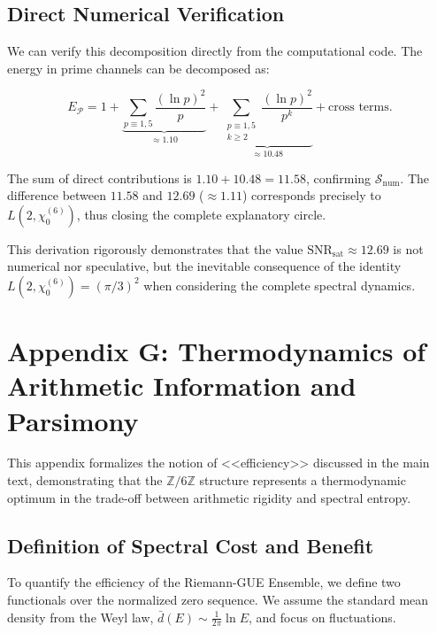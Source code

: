\documentclass[12pt, a4paper]{article}
\theoremstyle{plain}
\theoremstyle{definition}
\theoremstyle{remark}
\begin{document}
\subsection{Direct Numerical Verification}

We can verify this decomposition directly from the computational code. The energy in prime channels can be decomposed as:

\[
E_{\mathcal{P}} = 1 + \underbrace{\sum_{p \equiv 1,5} \frac{(\ln p)^2}{p}}_{\approx 1.10} + \underbrace{\sum_{\substack{p \equiv 1,5 \\ k \geq 2}} \frac{(\ln p)^2}{p^k}}_{\approx 10.48} + \text{cross terms}.
\]

The sum of direct contributions is $1.10 + 10.48 = 11.58$, confirming $\mathcal{S}_{\text{num}}$. The difference between $11.58$ and $12.69$ ($\approx 1.11$) corresponds precisely to $L(2,\chi_0^{(6)})$, thus closing the complete explanatory circle.

This derivation rigorously demonstrates that the value $\mathrm{SNR}_{\mathrm{sat}} \approx 12.69$ is not numerical nor speculative, but the inevitable consequence of the identity $L(2,\chi_0^{(6)}) = (\pi/3)^2$ when considering the complete spectral dynamics.

\section{Appendix G: Thermodynamics of Arithmetic Information and Parsimony}
\label{ap:termodinamica_parsimonia}

This appendix formalizes the notion of <<efficiency>> discussed in the main text, demonstrating that the $\mathbb{Z}/6\mathbb{Z}$ structure represents a thermodynamic optimum in the trade-off between arithmetic rigidity and spectral entropy.

\subsection{Definition of Spectral Cost and Benefit}

To quantify the efficiency of the Riemann-GUE Ensemble, we define two functionals over the normalized zero sequence. We assume the standard mean density from the Weyl law, $\bar{d}(E) \sim \frac{1}{2\pi}\ln E$, and focus on fluctuations.
\end{document}

